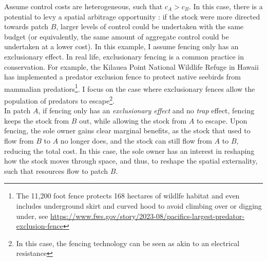 Assume control costs are heterogeneous, such that $c_A> c_B$. In this case, there is a potential to levy a spatial arbitrage opportunity : if the stock were more directed towards patch $B$, larger levels of control could be undertaken with the same budget (or equivalently, the same amount of aggregate control could be undertaken at a lower cost). 
In this example, I assume fencing only has an exclusionary effect. In real life, exclusionary fencing is a common practice in conservation. For example, the Kilauea Point National Wildlife Refuge in Hawaii has implemented a predator exclusion fence to protect native seebirds from mammalian predatiors\footnote{The 11,200 foot fence protects 168 hectares of wildlfe habitat and even includes underground skirt and curved hood to avoid climbing over or digging under, see \url{https://www.fws.gov/story/2023-08/pacifics-largest-predator-exclusion-fence}}. I focus on the case where exclusionary fences allow the population of predators to escape\footnote{In this case, the fencing technology can be seen as akin to an electrical resistance}.\\
In patch $A$, if fencing only has an \textit{exclusionary effect} and no \textit{trap} effect, fencing keeps the stock from $B$ out, while allowing the stock from $A$ to escape. Upon fencing, the sole owner gains clear marginal benefits, as the stock that used to flow from $B$ to $A$ no longer does, and the stock can still flow from $A$ to $B$, reducing the total cost. In this case,  the sole owner has an interest in reshaping how the stock moves through space, and thus, to reshape the spatial externality, such that resources flow to patch $B$.\\

